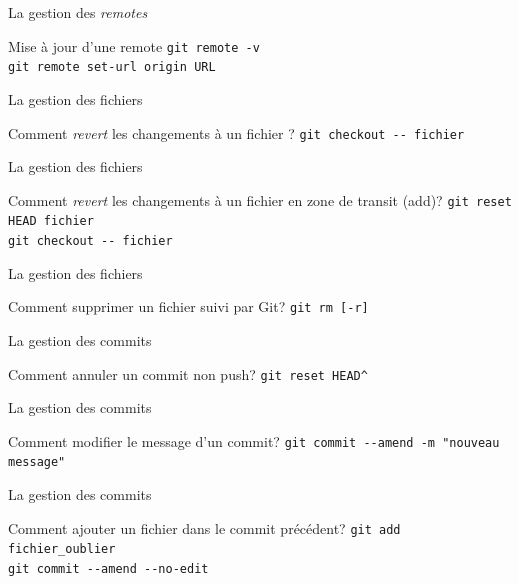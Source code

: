 \documentclass[11pt]{beamer}
\begin{document}
\begin{frame}[fragile]{La gestion des \textit{remotes}}
	\begin{block}{Mise à jour d'une remote}
		\verb|git remote -v| \\
		\verb|git remote set-url origin URL|
	\end{block}
\end{frame}

\begin{frame}[fragile]{La gestion des fichiers}
	\begin{block}{Comment \textit{revert} les changements à un fichier ?}
		\verb|git checkout -- fichier|
	\end{block}
\end{frame}

\begin{frame}[fragile]{La gestion des fichiers}
	\begin{block}{Comment \textit{revert} les changements à un fichier en zone de transit (add)?}
		\verb|git reset HEAD fichier| \\
		\verb|git checkout -- fichier|
	\end{block}
\end{frame}

\begin{frame}[fragile]{La gestion des fichiers}
	\begin{block}{Comment supprimer un fichier suivi par Git?}
		\verb|git rm [-r]| 
	\end{block}
\end{frame}

\begin{frame}[fragile]{La gestion des commits}
	\begin{block}{Comment annuler un commit non push?}
		\verb|git reset HEAD^| \\
	\end{block}
\end{frame}

\begin{frame}[fragile]{La gestion des commits}
	\begin{block}{Comment modifier le message d'un commit?}
		\verb|git commit --amend -m "nouveau message"|
	\end{block}
\end{frame}

\begin{frame}[fragile]{La gestion des commits}
	\begin{block}{Comment ajouter un fichier dans le commit précédent?}
		\verb|git add fichier_oublier| \\
		\verb|git commit --amend --no-edit|
	\end{block}
\end{frame}
\end{document}
